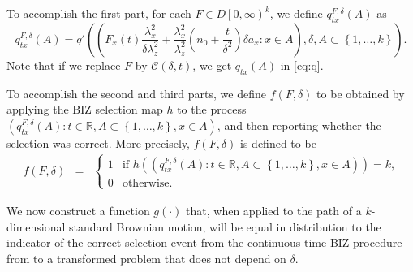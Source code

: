 \documentclass{wscpaperproc}
\theoremstyle{wsc}
\begin{document}
To accomplish the first part, for each $F\in D\left[0,\infty\right)^{k}$, 
we define $q_{tx}^{F,\delta}\left(A\right)$ as
\[
q_{tx}^{F,\delta}\left(A\right)=q'\left(\left(F_{x}\left(t\right)\frac{\lambda_{x}^{2}}{\delta\lambda_{z}^{2}}+\frac{\lambda_{x}^{2}}{\lambda_{z}^{2}}\left(n_{0}+\frac{t}{\delta^{2}}\right)\delta a_{x}:x\in A\right),\delta,A\subset\left\{ 1,\ldots,k\right\} \right).
\]
Note that if we replace $F$ by $\mathcal{C}\left(\delta,t\right)$,
we get $q_{tx}\left(A\right)$ in \eqref{eq:q}.   

To accomplish the second and third parts, we define
$f\left(F,\delta\right)$ to be obtained by applying the BIZ selection map $h$ to the process
$\left(q_{tx}^{F,\delta}\left(A\right):t\in\mathbb{R},A\subset\left\{ 1,\ldots,k\right\} ,x\in A\right)$, and then reporting whether the selection was correct.
More precisely, $f(F,\delta)$ is defined to be
\begin{eqnarray*}
f\left(F,\delta\right) & = & \begin{cases}
    1 & \text{if $h\left(\left(q_{tx}^{F,\delta}\left(A\right):t\in\mathbb{R},A\subset\left\{ 1,\ldots,k\right\} ,x\in A\right)\right) = k$,}\\
0 & \text{otherwise.}
\end{cases}
\end{eqnarray*}

We now construct a function $g(\cdot)$ that, when applied to the path of a $k$-dimensional standard Brownian motion, will be equal in distribution to the indicator of the correct selection event from the continuous-time BIZ procedure from \cite{Frazier:BIZ} 
to a transformed problem that does not depend on $\delta$.
\end{document}
